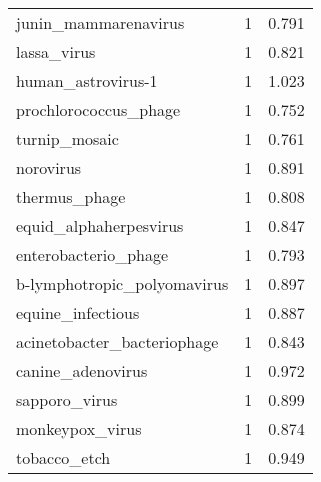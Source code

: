 \begin{tabular}{lrr}
                     junin\_mammarenavirus &                   1 &     0.791 \\
                              lassa\_virus &                   1 &     0.821 \\
                       human\_astrovirus-1 &                   1 &     1.023 \\
                    prochlorococcus\_phage &                   1 &     0.752 \\
                            turnip\_mosaic &                   1 &     0.761 \\
                                norovirus &                   1 &     0.891 \\
                            thermus\_phage &                   1 &     0.808 \\
                   equid\_alphaherpesvirus &                   1 &     0.847 \\
                     enterobacterio\_phage &                   1 &     0.793 \\
              b-lymphotropic\_polyomavirus &                   1 &     0.897 \\
                        equine\_infectious &                   1 &     0.887 \\
              acinetobacter\_bacteriophage &                   1 &     0.843 \\
                        canine\_adenovirus &                   1 &     0.972 \\
                            sapporo\_virus &                   1 &     0.899 \\
                          monkeypox\_virus &                   1 &     0.874 \\
                             tobacco\_etch &                   1 &     0.949 \\
\bottomrule
\end{tabular}
